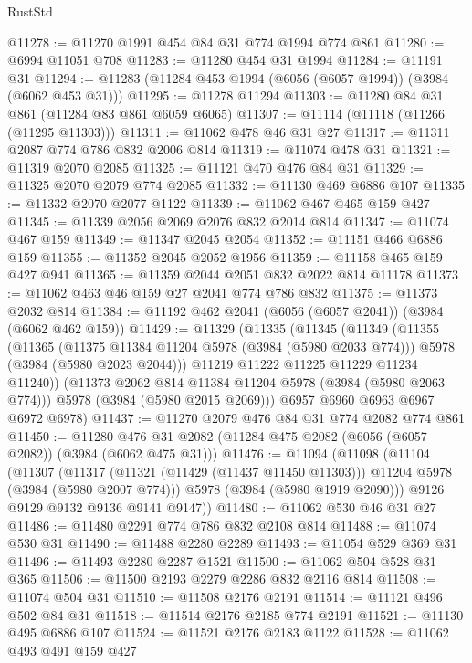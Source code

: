 \begin{lexlean}{RustStd}
\begin{coremodule}
@11278 := @11270 @1991 @454 @84 @31 @774 @1994 @774 @861
@11280 := @6994 @11051 @708
@11283 := @11280 @454 @31 @1994
@11284 := @11191 @31
@11294 := @11283 (@11284 @453 @1994 (@6056 (@6057 @1994)) (@3984 (@6062 @453 @31)))
@11295 := @11278 @11294
@11303 := @11280 @84 @31 @861 (@11284 @83 @861 @6059 @6065)
@11307 := @11114 (@11118 (@11266 (@11295 @11303)))
@11311 := @11062 @478 @46 @31 @27
@11317 := @11311 @2087 @774 @786 @832 @2006 @814
@11319 := @11074 @478 @31
@11321 := @11319 @2070 @2085
@11325 := @11121 @470 @476 @84 @31
@11329 := @11325 @2070 @2079 @774 @2085
@11332 := @11130 @469 @6886 @107
@11335 := @11332 @2070 @2077 @1122
@11339 := @11062 @467 @465 @159 @427
@11345 := @11339 @2056 @2069 @2076 @832 @2014 @814
@11347 := @11074 @467 @159
@11349 := @11347 @2045 @2054
@11352 := @11151 @466 @6886 @159
@11355 := @11352 @2045 @2052 @1956
@11359 := @11158 @465 @159 @427 @941
@11365 := @11359 @2044 @2051 @832 @2022 @814 @11178
@11373 := @11062 @463 @46 @159 @27 @2041 @774 @786 @832
@11375 := @11373 @2032 @814
@11384 := @11192 @462 @2041 (@6056 (@6057 @2041)) (@3984 (@6062 @462 @159))
@11429 := @11329
    (@11335
      (@11345
        (@11349
          (@11355
            (@11365
              (@11375 @11384 @11204 @5978 (@3984 (@5980 @2033 @774)))
              @5978
              (@3984 (@5980 @2023 @2044)))
            @11219
            @11222
            @11225
            @11229
            @11234
            @11240))
        (@11373 @2062 @814 @11384 @11204 @5978 (@3984 (@5980 @2063 @774)))
        @5978
        (@3984 (@5980 @2015 @2069)))
      @6957
      @6960
      @6963
      @6967
      @6972
      @6978)
@11437 := @11270 @2079 @476 @84 @31 @774 @2082 @774 @861
@11450 := @11280 @476 @31 @2082 (@11284 @475 @2082 (@6056 (@6057 @2082)) (@3984 (@6062 @475 @31)))
@11476 := @11094
    (@11098
      (@11104
        (@11307
          (@11317 (@11321 (@11429 (@11437 @11450 @11303))) @11204 @5978 (@3984 (@5980 @2007 @774)))
          @5978
          (@3984 (@5980 @1919 @2090)))
        @9126
        @9129
        @9132
        @9136
        @9141
        @9147))
@11480 := @11062 @530 @46 @31 @27
@11486 := @11480 @2291 @774 @786 @832 @2108 @814
@11488 := @11074 @530 @31
@11490 := @11488 @2280 @2289
@11493 := @11054 @529 @369 @31
@11496 := @11493 @2280 @2287 @1521
@11500 := @11062 @504 @528 @31 @365
@11506 := @11500 @2193 @2279 @2286 @832 @2116 @814
@11508 := @11074 @504 @31
@11510 := @11508 @2176 @2191
@11514 := @11121 @496 @502 @84 @31
@11518 := @11514 @2176 @2185 @774 @2191
@11521 := @11130 @495 @6886 @107
@11524 := @11521 @2176 @2183 @1122
@11528 := @11062 @493 @491 @159 @427

\end{coremodule}
\end{lexlean}
